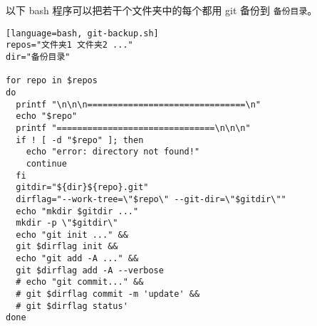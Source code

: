 
\begin{issues}
\issueDraft
\end{issues}

以下 bash 程序可以把若干个文件夹中的每个都用 git 备份到 \verb|备份目录|。

\begin{lstlisting}[language=bash, git-backup.sh]
repos="文件夹1 文件夹2 ..."
dir="备份目录"

for repo in $repos
do
  printf "\n\n\n===============================\n"
  echo "$repo"
  printf "===============================\n\n\n"
  if ! [ -d "$repo" ]; then
    echo "error: directory not found!"
    continue
  fi
  gitdir="${dir}${repo}.git"
  dirflag="--work-tree=\"$repo\" --git-dir=\"$gitdir\""
  echo "mkdir $gitdir ..."
  mkdir -p \"$gitdir\"
  echo "git init ..." &&
  git $dirflag init &&
  echo "git add -A ..." &&
  git $dirflag add -A --verbose
  # echo "git commit..." &&
  # git $dirflag commit -m 'update' &&
  # git $dirflag status'
done
\end{lstlisting}
